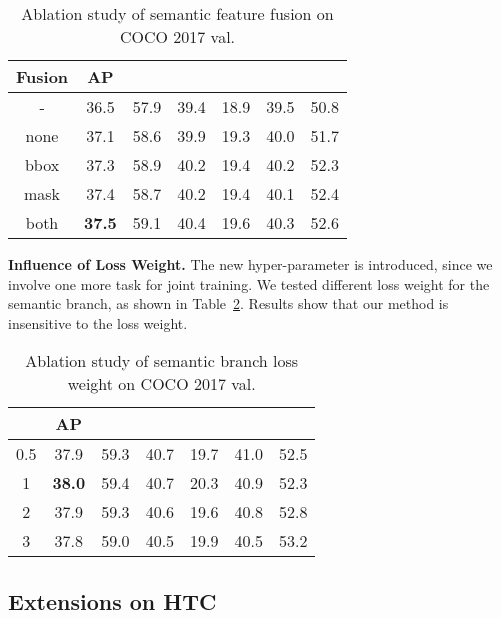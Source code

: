 \documentclass[10pt,twocolumn,letterpaper]{article}
\begin{document}
\begin{table}[htb]
	\centering
	\caption{Ablation study of semantic feature fusion on COCO 2017 val.}
	\addtolength{\tabcolsep}{-2pt}
	\begin{tabular}{*{7}{c}}
		\toprule
		Fusion & AP   &  &  &  &  &  \\
		\midrule
		-             & 36.5 & 57.9 & 39.4 & 18.9 & 39.5 & 50.8 \\
		none          & 37.1 & 58.6 & 39.9 & 19.3 & 40.0 & 51.7 \\
		bbox          & 37.3 & 58.9 & 40.2 & 19.4 & 40.2 & 52.3 \\
		mask          & 37.4 & 58.7 & 40.2 & 19.4 & 40.1 & 52.4 \\
		both          & \textbf{37.5} & 59.1 & 40.4 & 19.6 & 40.3 & 52.6 \\
		\bottomrule
	\end{tabular}
	\vspace{-0.3cm}
	\label{tab:semantic}
\end{table}

\noindent\textbf{Influence of Loss Weight.}
The new hyper-parameter  is introduced, since we involve one more task for joint training.
We tested different loss weight for the semantic branch, as shown in Table~\ref{tab:loss-weight}.
Results show that our method is insensitive to the loss weight.

\begin{table}[htb]
	\centering
	\caption{Ablation study of semantic branch loss weight  on COCO 2017 val.}
	\addtolength{\tabcolsep}{-2pt}
	\begin{tabular}{*{7}{c}}
		\toprule
		 & AP &  &  &  &  &  \\
		\midrule
		0.5     &37.9&       59.3       &      40.7        &      19.7       &      41.0       &       52.5      \\
		1       &\textbf{38.0}&       59.4       &      40.7        &      20.3       &      40.9       &       52.3      \\
		2       &37.9&       59.3       &      40.6        &      19.6       &      40.8       &       52.8      \\
		3       &37.8&       59.0       &      40.5        &      19.9       &      40.5       &       53.2      \\
		\bottomrule
	\end{tabular}
	\label{tab:loss-weight}
\end{table}

\subsection{Extensions on HTC}
\end{document}
